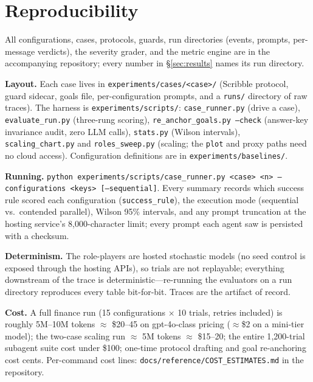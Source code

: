 \documentclass{article}
\begin{document}
\section{Reproducibility}\label{app:repro}
All configurations, cases, protocols, guards, run directories (events, prompts, per-message verdicts), the severity grader, and the metric engine are in the accompanying repository; every number in \S\ref{sec:results} names its run directory.

\textbf{Layout.} Each case lives in \texttt{experiments/cases/<case>/} (Scribble protocol, guard sidecar, goals file, per-configuration prompts, and a \texttt{runs/} directory of raw traces). The harness is \texttt{experiments/scripts/}: \texttt{case\_runner.py} (drive a case), \texttt{evaluate\_run.py} (three-rung scoring), \texttt{re\_anchor\_goals.py --check} (answer-key invariance audit, zero LLM calls), \texttt{stats.py} (Wilson intervals), \texttt{scaling\_chart.py} and \texttt{roles\_sweep.py} (scaling; the \texttt{plot} and proxy paths need no cloud access). Configuration definitions are in \texttt{experiments/baselines/}.

\textbf{Running.} \texttt{python experiments/scripts/case\_runner.py <case> <n> --configurations <keys> [--sequential]}. Every summary records which success rule scored each configuration (\texttt{success\_rule}), the execution mode (sequential vs.\ contended parallel), Wilson 95\% intervals, and any prompt truncation at the hosting service's 8{,}000-character limit; every prompt each agent saw is persisted with a checksum.

\textbf{Determinism.} The role-players are hosted stochastic models (no seed control is exposed through the hosting APIs), so trials are not replayable; everything downstream of the trace is deterministic---re-running the evaluators on a run directory reproduces every table bit-for-bit. Traces are the artifact of record.

\textbf{Cost.} A full finance run (15 configurations $\times$ 10 trials, retries included) is roughly 5M--10M tokens $\approx$ \$20--45 on gpt-4o-class pricing ($\approx$\$2 on a mini-tier model); the two-case scaling run $\approx$ 5M tokens $\approx$ \$15--20; the entire 1{,}200-trial subagent suite cost under \$100; one-time protocol drafting and goal re-anchoring cost cents. Per-command cost lines: \texttt{docs/reference/COST\_ESTIMATES.md} in the repository.
\end{document}
